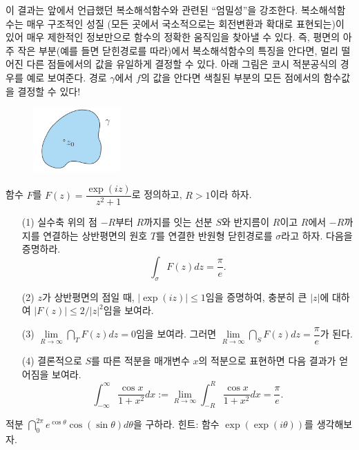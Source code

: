 이 결과는 앞에서 언급했던  복소해석함수와 관련된 ``엄밀성''을 강조한다.
복소해석함수는 매우 구조적인 성질 (모든 곳에서 국소적으로는 회전변환과 확대로 표현되는)이 있어
매우 제한적인 정보만으로 함수의 정확한 움직임을 찾아낼 수 있다.
즉, 평면의 아주 작은 부분(예를 들면 닫힌경로를 따라)에서 복소해석함수의 특징을 안다면,
멀리 떨어진 다른 점들에서의 값을 유일하게 결정할 수 있다.
아래 그림은 코시 적분공식의 경우를 예로 보여준다.
경로 $\gamma$에서 $f$의 값을 안다면 색칠된 부분의 모든 점에서의 함수값을 결정할 수 있다!
\begin{figure}[h!]
\begin{center}
\includegraphics[width=0.3\textwidth]{./SaltChapter/fig-3-0-10}
\end{center}
\end{figure}

\begin{salt_exercise} \label{ex-3-27}
함수 $F$를 $F(z) = \dfrac{\exp(iz)}{z^2+1}$로 정의하고, $R>1$이라 하자.
\begin{itemize}
\item[(1)]
실수축 위의 점 $-R$부터 $R$까지를 잇는 선분 $S$와
반지름이 $R$이고 $R$에서 $-R$까지를 연결하는 상반평면의 원호 $T$를 연결한 
반원형 닫힌경로를 $\sigma$라고 하자.
다음을 증명하라.
\[
\int_\sigma F(z)dz = \dfrac\pi e.
\]
\item[(2)] $z$가 상반평면의 점일 때, $|\exp(iz)|\le 1$임을 증명하여,
충분히 큰 $|z|$에 대하여 $|F(z)| \le 2/|z|^2$임을 보여라.
\item[(3)] $\lim\limits_{R\to\infty} \dint_T F(z)dz = 0$임을 보여라.
그러면 $\lim\limits_{R\to\infty} \dint_S F(z)dz = \dfrac\pi e$가 된다.
\item[(4)] 결론적으로 $S$를 따른 적분을 매개변수 $x$의 적분으로 표현하면 다음 결과가 얻어짐을 보여라.
\[
\int_{-\infty}^\infty \dfrac{\cos x}{1+x^2}dx := 
\lim_{R\to\infty} \int_{-R}^R \dfrac{\cos x}{1+x^2} dx = \dfrac \pi e.
\]
\end{itemize}
\end{salt_exercise}

\begin{salt_exercise} \label{ex-3-28}
적분 $\dint_0^{2\pi} e^{\cos \theta} \cos(\sin\theta)d\theta$을 구하라.
힌트: 함수 $\exp(\exp(i\theta))$를 생각해보자.
\end{salt_exercise}

